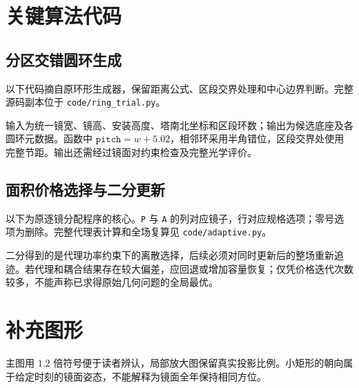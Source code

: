 \clearpage
\section{关键算法代码}
\subsection{分区交错圆环生成}
以下代码摘自原环形生成器，保留距离公式、区段交界处理和中心边界判断。完整源码副本位于 \texttt{code/ring\_trial.py}。

输入为统一镜宽、镜高、安装高度、塔南北坐标和区段环数；输出为候选底座及各圆环元数据。函数中 $\texttt{pitch}=w+5.02$，相邻环采用半角错位，区段交界处使用完整节距。输出还需经过镜面对约束检查及完整光学评价。

\clearpage
\subsection{面积价格选择与二分更新}
以下为原逐镜分配程序的核心。\texttt{P} 与 \texttt{A} 的列对应镜子，行对应规格选项；零号选项为删除。完整代理表计算和全场复算见 \texttt{code/adaptive.py}。

二分得到的是代理功率约束下的离散选择，后续必须对同时更新后的整场重新追迹。若代理和耦合结果存在较大偏差，应回退或增加容量恢复；仅凭价格迭代次数较多，不能声称已求得原始几何问题的全局最优。

\clearpage
\section{补充图形}
主图用 $1.2$ 倍符号便于读者辨认，局部放大图保留真实投影比例。小矩形的朝向属于给定时刻的镜面姿态，不能解释为镜面全年保持相同方位。

\clearpage
{}

\clearpage
